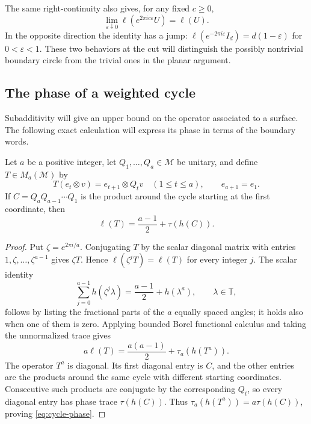 The same right-continuity also gives, for any fixed $c\geq0$,
\begin{equation}\label{eq:phase-right-limit}
 \lim_{\varepsilon\downarrow0}
 \ell(e^{2\pi i c\varepsilon}U)=\ell(U).
\end{equation}
In the opposite direction the identity has a jump:
$\ell(e^{-2\pi i\varepsilon}I_d)=d(1-\varepsilon)$ for
$0<\varepsilon<1$.  These two behaviors at the cut will distinguish the
possibly nontrivial boundary circle from the trivial ones in the planar
argument.

\subsection{The phase of a weighted cycle}

Subadditivity will give an upper bound on the operator associated to a
surface.  The following exact calculation will express its phase in terms
of the boundary words.

\begin{lemma}\label{lem:cycle-phase}
Let $a$ be a positive integer, let $Q_1,\ldots,Q_a\in\mathcal M$ be unitary, and define
$T\in M_a(\mathcal M)$ by
\[
 T(e_t\otimes v)=e_{t+1}\otimes Q_tv\quad(1\leq t\leq a),
 \qquad e_{a+1}=e_1.
\]
If $C=Q_aQ_{a-1}\cdots Q_1$ is the product around the cycle starting at
the first coordinate, then
\begin{equation}\label{eq:cycle-phase}
 \ell(T)=\frac{a-1}{2}+\tau(h(C)).
\end{equation}
\end{lemma}

\begin{proof}
Put $\zeta=e^{2\pi i/a}$.  Conjugating $T$ by the scalar diagonal matrix
with entries $1,\zeta,\ldots,\zeta^{a-1}$ gives $\zeta T$.  Hence
$\ell(\zeta^jT)=\ell(T)$ for every integer $j$.  The scalar identity
\[
 \sum_{j=0}^{a-1}h(\zeta^j\lambda)
 =\frac{a-1}{2}+h(\lambda^a),\qquad \lambda\in\mathbb T,
\]
follows by listing the fractional parts of the $a$ equally spaced angles;
it holds also when one of them is zero.  Applying bounded Borel functional
calculus and taking the unnormalized trace gives
\[
 a\ell(T)=\frac{a(a-1)}2+\tau_a(h(T^a)).
\]
The operator $T^a$ is diagonal.  Its first diagonal entry is $C$, and the
other entries are the products around the same cycle with different
starting coordinates.  Consecutive such products are conjugate by the
corresponding $Q_t$, so every diagonal entry has phase trace
$\tau(h(C))$.  Thus $\tau_a(h(T^a))=a\tau(h(C))$, proving
\eqref{eq:cycle-phase}.
\end{proof}
